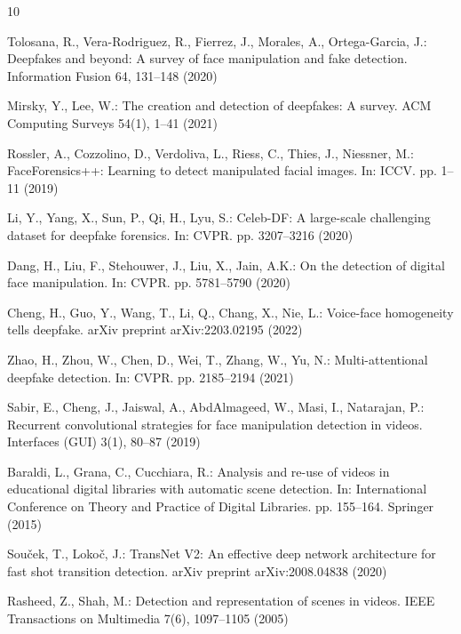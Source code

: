 \documentclass[runningheads]{llncs}
\begin{document}
%
%
\begin{thebibliography}{10}

Tolosana, R., Vera-Rodriguez, R., Fierrez, J., Morales, A., Ortega-Garcia, J.: Deepfakes and beyond: A survey of face manipulation and fake detection. Information Fusion 64, 131--148 (2020)

Mirsky, Y., Lee, W.: The creation and detection of deepfakes: A survey. ACM Computing Surveys 54(1), 1--41 (2021)

Rossler, A., Cozzolino, D., Verdoliva, L., Riess, C., Thies, J., Niessner, M.: FaceForensics++: Learning to detect manipulated facial images. In: ICCV. pp. 1--11 (2019)

Li, Y., Yang, X., Sun, P., Qi, H., Lyu, S.: Celeb-DF: A large-scale challenging dataset for deepfake forensics. In: CVPR. pp. 3207--3216 (2020)

Dang, H., Liu, F., Stehouwer, J., Liu, X., Jain, A.K.: On the detection of digital face manipulation. In: CVPR. pp. 5781--5790 (2020)

Cheng, H., Guo, Y., Wang, T., Li, Q., Chang, X., Nie, L.: Voice-face homogeneity tells deepfake. arXiv preprint arXiv:2203.02195 (2022)

Zhao, H., Zhou, W., Chen, D., Wei, T., Zhang, W., Yu, N.: Multi-attentional deepfake detection. In: CVPR. pp. 2185--2194 (2021)

Sabir, E., Cheng, J., Jaiswal, A., AbdAlmageed, W., Masi, I., Natarajan, P.: Recurrent convolutional strategies for face manipulation detection in videos. Interfaces (GUI) 3(1), 80--87 (2019)

Baraldi, L., Grana, C., Cucchiara, R.: Analysis and re-use of videos in educational digital libraries with automatic scene detection. In: International Conference on Theory and Practice of Digital Libraries. pp. 155--164. Springer (2015)

Souček, T., Lokoč, J.: TransNet V2: An effective deep network architecture for fast shot transition detection. arXiv preprint arXiv:2008.04838 (2020)

Rasheed, Z., Shah, M.: Detection and representation of scenes in videos. IEEE Transactions on Multimedia 7(6), 1097--1105 (2005)


\end{thebibliography}
\end{document}
